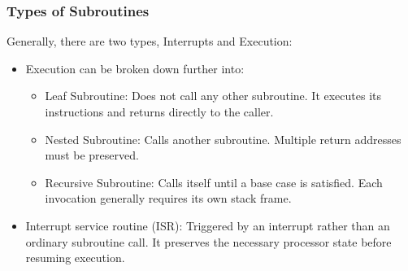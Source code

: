 \documentclass[11pt]{article}
\begin{document}
\subsubsection{Types of Subroutines}
Generally, there are two types, Interrupts and Execution:
\begin{itemize}
  \item Execution can be broken down further into:
  \begin{itemize}
    \item Leaf Subroutine: Does not call any other subroutine. It executes its instructions and returns directly to the caller.
    \item Nested Subroutine: Calls another subroutine. Multiple return addresses must be preserved.
    \item Recursive Subroutine: Calls itself until a base case is satisfied. Each invocation generally requires its own stack frame.
  \end{itemize}
  \item Interrupt service routine (ISR): Triggered by an interrupt rather than an ordinary subroutine call. It preserves the necessary processor state before resuming execution.
\end{itemize}
\end{document}
